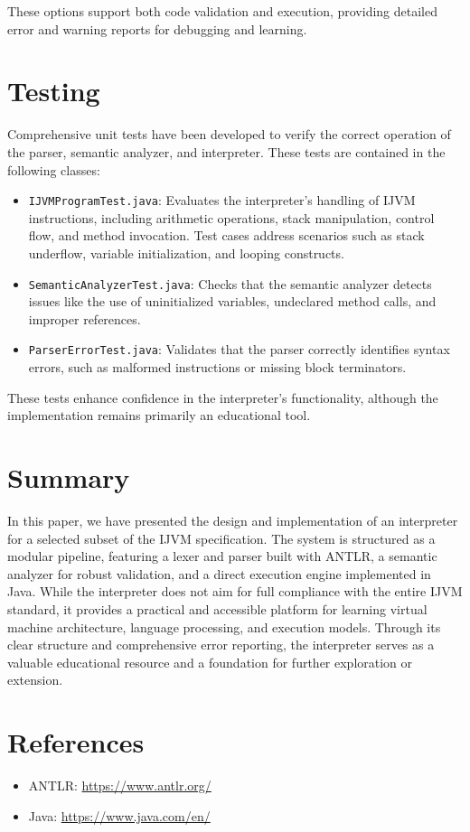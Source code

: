 \documentclass[11pt]{article}
\begin{document}
These options support both code validation and execution, providing detailed error and warning reports for debugging and learning.

\section{Testing}
Comprehensive unit tests have been developed to verify the correct operation of the parser, semantic analyzer, and interpreter. These tests are contained in the following classes:

\begin{itemize}
    \item \texttt{IJVMProgramTest.java}: Evaluates the interpreter's handling of IJVM instructions, including arithmetic operations, stack manipulation, control flow, and method invocation. Test cases address scenarios such as stack underflow, variable initialization, and looping constructs.
    \item \texttt{SemanticAnalyzerTest.java}: Checks that the semantic analyzer detects issues like the use of uninitialized variables, undeclared method calls, and improper references.
    \item \texttt{ParserErrorTest.java}: Validates that the parser correctly identifies syntax errors, such as malformed instructions or missing block terminators.
\end{itemize}

These tests enhance confidence in the interpreter's functionality, although the implementation remains primarily an educational tool.

\section{Summary}
In this paper, we have presented the design and implementation of an interpreter for a selected subset of the IJVM specification. The system is structured as a modular pipeline, featuring a lexer and parser built with ANTLR, a semantic analyzer for robust validation, and a direct execution engine implemented in Java. While the interpreter does not aim for full compliance with the entire IJVM standard, it provides a practical and accessible platform for learning virtual machine architecture, language processing, and execution models. Through its clear structure and comprehensive error reporting, the interpreter serves as a valuable educational resource and a foundation for further exploration or extension.

\section*{References}
\begin{itemize}
    \item ANTLR: \url{https://www.antlr.org/}
    \item Java: \url{https://www.java.com/en/}
\end{itemize}
\end{document}
